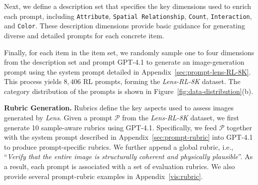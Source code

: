 \documentclass{llmxive}
\begin{document}
Next, we define a description set that specifies the key dimensions used to enrich each prompt, including \texttt{Attribute}, \texttt{Spatial Relationship}, \texttt{Count}, \texttt{Interaction}, and \texttt{Color}. These description dimensions provide basic guidance for generating diverse and detailed prompts for each concrete item.


Finally, for each item in the item set, we randomly sample one to four dimensions from the description set and prompt GPT-4.1 to generate an image-generation prompt using the system prompt detailed in Appendix~\ref{sec:prompt-lens-RL-8K}. This process yields $8,406$ RL prompts, forming the \textit{Lens-RL-8K} dataset. The category distribution of the prompts is shown in Figure~\ref{fig:data-distribution}(b).



\noindent\textbf{Rubric Generation.}
Rubrics define the key aspects used to assess images generated by \textit{Lens}. Given a prompt $\mathcal{P}$ from the \textit{Lens-RL-8K} dataset, we first generate 10 sample-aware rubrics using GPT-4.1. Specifically, we feed $\mathcal{P}$ together with the system prompt described in Appendix~\ref{sec:prompt-rubric} into GPT-4.1 to produce prompt-specific rubrics. We further append a global rubric, i.e., ``\textit{Verify that the entire image is structurally coherent and physically plausible}''. As a result, each prompt is associated with a set of evaluation rubrics. We also provide several prompt-rubric examples in Appendix~\ref{vis:rubric}.
\end{document}
